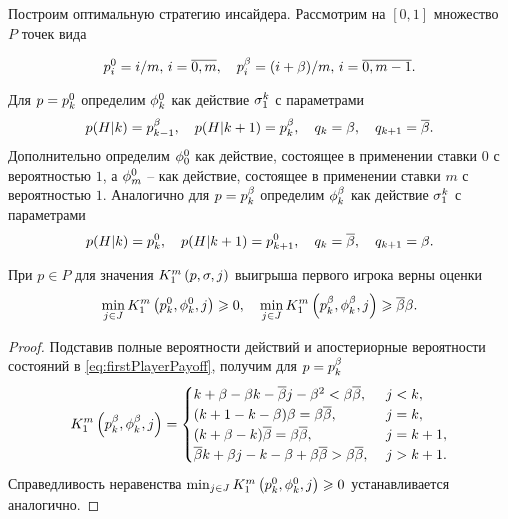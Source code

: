 Построим оптимальную стратегию инсайдера. Рассмотрим на $[0,1]$ множество $P$
точек вида

\[
\pEven[i] = i/m, \, i = \overline{0, m}, \quad \pOdd[i] = (i + \Co)/m, \, i =
\overline{0, m - 1}.
\]

Для $p = \pEven$ определим $\fEven$ как действие $\fGeneral{k}$ с параметрами
\begin{equation*}
  p(H|k) = \pOdd[k-1], \quad p(H|k + 1) = \pOdd[k], \quad q_k = \Co, \quad q_{k+1} = \DCo.
\end{equation*}
Дополнительно определим $\fEven[0]$ как действие, состоящее в применении ставки
$0$ с вероятностью $1$, а $\fEven[m]$ -- как действие, состоящее в применении
ставки $m$ с вероятностью $1$. Аналогично для $p = \pOdd$ определим $\fOdd$ как
действие $\fGeneral{k}$ с параметрами
\begin{equation*}
  p(H|k) = \pEven[k], \quad p(H|k + 1) = \pEven[k+1], \quad q_k = \DCo, \quad q_{k+1} = \Co.
\end{equation*}

\begin{proposition}
  При $p \in P$ для значения $\firstPlayerPayoff{1}{p}{\sigma}{j}$ выигрыша
  первого игрока верны оценки
  \begin{equation}
    \label{eq:lowerBound:inequalities}
    \min_{j \in J}
    \firstPlayerPayoff{1}{\pEven}{\fEven}{j} \geq 0,
    \quad
    \min_{j \in J}
    \firstPlayerPayoff{1}{\pOdd}{\fOdd}{j} \geq \DCo\Co.
  \end{equation}
\end{proposition}
\begin{proof}
  Подставив полные вероятности действий и апостериорные вероятности состояний в
  \eqref{eq:firstPlayerPayoff}, получим для $p = \pOdd[k]$
  \begin{equation*}
    \firstPlayerPayoff{1}{\pOdd}{\fOdd}{j} = \begin{cases}
      k + \Co - \Co k - \DCo j - \Co^2 < \Co \DCo,\ & j < k,\\
      (k + 1 - k - \Co) \Co = \Co \DCo,\ & j = k,\\
      (k + \Co - k) \DCo = \Co \DCo,\ & j = k+1,\\
      \DCo k + \Co j - k - \Co + \Co \DCo > \Co \DCo,\ & j > k+1.
    \end{cases}
  \end{equation*}
  Справедливость неравенства %
  $\min_{j \in J} \firstPlayerPayoff{1}{\pEven}{\fEven}{j} \geq 0$ %
  устанавливается аналогично.
\end{proof}

